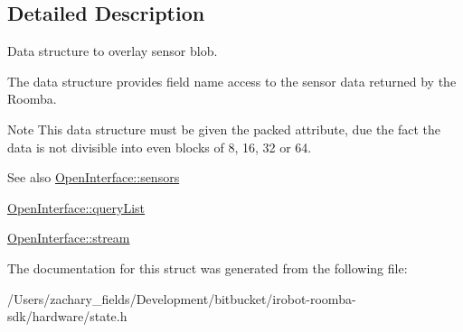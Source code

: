 \subsection{Detailed Description}
Data structure to overlay sensor blob. 

The data structure provides field name access to the sensor data returned by the Roomba. \begin{DoxyNote}{Note}
This data structure must be given the packed attribute, due the fact the data is not divisible into even blocks of 8, 16, 32 or 64. 
\end{DoxyNote}
\begin{DoxySeeAlso}{See also}
\hyperlink{classroomba_1_1_open_interface_aa676703a4c79547397eaa89ddb9e207c}{Open\+Interface\+::sensors} 

\hyperlink{classroomba_1_1_open_interface_a4a7308a7119c6a462389d9ffa3785f87}{Open\+Interface\+::query\+List} 

\hyperlink{classroomba_1_1_open_interface_af7a1adea482ac71fa9057842a955af6e}{Open\+Interface\+::stream} 
\end{DoxySeeAlso}


The documentation for this struct was generated from the following file\+:\begin{DoxyCompactItemize}
\item 
/\+Users/zachary\+\_\+fields/\+Development/bitbucket/irobot-\/roomba-\/sdk/hardware/state.\+h\end{DoxyCompactItemize}
